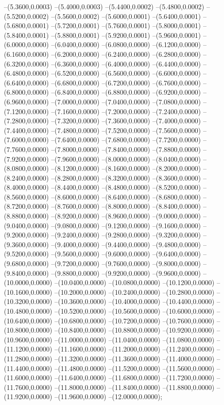 {	--(5.3600,0.0003)
	--(5.4000,0.0003)
	--(5.4400,0.0002)
	--(5.4800,0.0002)
	--(5.5200,0.0002)
	--(5.5600,0.0002)
	--(5.6000,0.0001)
	--(5.6400,0.0001)
	--(5.6800,0.0001)
	--(5.7200,0.0001)
	--(5.7600,0.0001)
	--(5.8000,0.0001)
	--(5.8400,0.0001)
	--(5.8800,0.0001)
	--(5.9200,0.0001)
	--(5.9600,0.0001)
	--(6.0000,0.0000)
	--(6.0400,0.0000)
	--(6.0800,0.0000)
	--(6.1200,0.0000)
	--(6.1600,0.0000)
	--(6.2000,0.0000)
	--(6.2400,0.0000)
	--(6.2800,0.0000)
	--(6.3200,0.0000)
	--(6.3600,0.0000)
	--(6.4000,0.0000)
	--(6.4400,0.0000)
	--(6.4800,0.0000)
	--(6.5200,0.0000)
	--(6.5600,0.0000)
	--(6.6000,0.0000)
	--(6.6400,0.0000)
	--(6.6800,0.0000)
	--(6.7200,0.0000)
	--(6.7600,0.0000)
	--(6.8000,0.0000)
	--(6.8400,0.0000)
	--(6.8800,0.0000)
	--(6.9200,0.0000)
	--(6.9600,0.0000)
	--(7.0000,0.0000)
	--(7.0400,0.0000)
	--(7.0800,0.0000)
	--(7.1200,0.0000)
	--(7.1600,0.0000)
	--(7.2000,0.0000)
	--(7.2400,0.0000)
	--(7.2800,0.0000)
	--(7.3200,0.0000)
	--(7.3600,0.0000)
	--(7.4000,0.0000)
	--(7.4400,0.0000)
	--(7.4800,0.0000)
	--(7.5200,0.0000)
	--(7.5600,0.0000)
	--(7.6000,0.0000)
	--(7.6400,0.0000)
	--(7.6800,0.0000)
	--(7.7200,0.0000)
	--(7.7600,0.0000)
	--(7.8000,0.0000)
	--(7.8400,0.0000)
	--(7.8800,0.0000)
	--(7.9200,0.0000)
	--(7.9600,0.0000)
	--(8.0000,0.0000)
	--(8.0400,0.0000)
	--(8.0800,0.0000)
	--(8.1200,0.0000)
	--(8.1600,0.0000)
	--(8.2000,0.0000)
	--(8.2400,0.0000)
	--(8.2800,0.0000)
	--(8.3200,0.0000)
	--(8.3600,0.0000)
	--(8.4000,0.0000)
	--(8.4400,0.0000)
	--(8.4800,0.0000)
	--(8.5200,0.0000)
	--(8.5600,0.0000)
	--(8.6000,0.0000)
	--(8.6400,0.0000)
	--(8.6800,0.0000)
	--(8.7200,0.0000)
	--(8.7600,0.0000)
	--(8.8000,0.0000)
	--(8.8400,0.0000)
	--(8.8800,0.0000)
	--(8.9200,0.0000)
	--(8.9600,0.0000)
	--(9.0000,0.0000)
	--(9.0400,0.0000)
	--(9.0800,0.0000)
	--(9.1200,0.0000)
	--(9.1600,0.0000)
	--(9.2000,0.0000)
	--(9.2400,0.0000)
	--(9.2800,0.0000)
	--(9.3200,0.0000)
	--(9.3600,0.0000)
	--(9.4000,0.0000)
	--(9.4400,0.0000)
	--(9.4800,0.0000)
	--(9.5200,0.0000)
	--(9.5600,0.0000)
	--(9.6000,0.0000)
	--(9.6400,0.0000)
	--(9.6800,0.0000)
	--(9.7200,0.0000)
	--(9.7600,0.0000)
	--(9.8000,0.0000)
	--(9.8400,0.0000)
	--(9.8800,0.0000)
	--(9.9200,0.0000)
	--(9.9600,0.0000)
	--(10.0000,0.0000)
	--(10.0400,0.0000)
	--(10.0800,0.0000)
	--(10.1200,0.0000)
	--(10.1600,0.0000)
	--(10.2000,0.0000)
	--(10.2400,0.0000)
	--(10.2800,0.0000)
	--(10.3200,0.0000)
	--(10.3600,0.0000)
	--(10.4000,0.0000)
	--(10.4400,0.0000)
	--(10.4800,0.0000)
	--(10.5200,0.0000)
	--(10.5600,0.0000)
	--(10.6000,0.0000)
	--(10.6400,0.0000)
	--(10.6800,0.0000)
	--(10.7200,0.0000)
	--(10.7600,0.0000)
	--(10.8000,0.0000)
	--(10.8400,0.0000)
	--(10.8800,0.0000)
	--(10.9200,0.0000)
	--(10.9600,0.0000)
	--(11.0000,0.0000)
	--(11.0400,0.0000)
	--(11.0800,0.0000)
	--(11.1200,0.0000)
	--(11.1600,0.0000)
	--(11.2000,0.0000)
	--(11.2400,0.0000)
	--(11.2800,0.0000)
	--(11.3200,0.0000)
	--(11.3600,0.0000)
	--(11.4000,0.0000)
	--(11.4400,0.0000)
	--(11.4800,0.0000)
	--(11.5200,0.0000)
	--(11.5600,0.0000)
	--(11.6000,0.0000)
	--(11.6400,0.0000)
	--(11.6800,0.0000)
	--(11.7200,0.0000)
	--(11.7600,0.0000)
	--(11.8000,0.0000)
	--(11.8400,0.0000)
	--(11.8800,0.0000)
	--(11.9200,0.0000)
	--(11.9600,0.0000)
	--(12.0000,0.0000);
}

